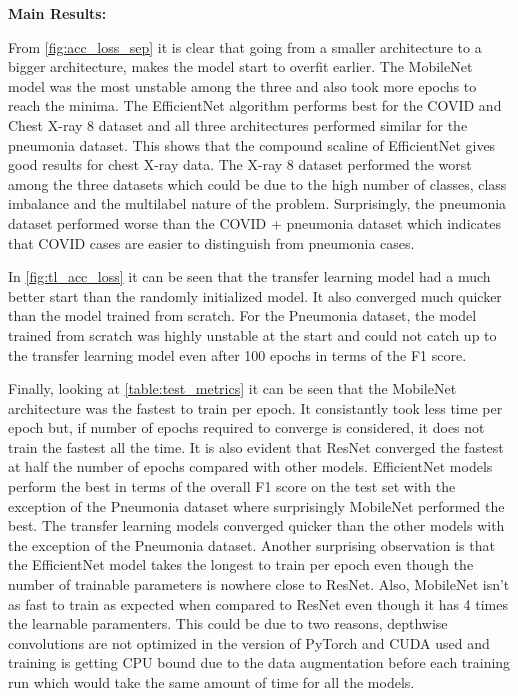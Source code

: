 \documentclass[10pt,twocolumn,letterpaper]{article}
\begin{document}
\textbf{Main Results:}

From \cref{fig:acc_loss_sep} it is clear that going from a smaller 
architecture to a bigger architecture, makes the model start to overfit earlier. 
The MobileNet model was the most unstable among the three and also took more epochs to reach 
the minima. The EfficientNet algorithm performs best for the COVID and Chest X-ray 8 
dataset and all three architectures performed similar for the pneumonia dataset. 
This shows that the compound scaline of EfficientNet gives good results for chest X-ray data.
The X-ray 8 dataset performed the worst among the three datasets which could be due to the 
high number of classes, class imbalance and the multilabel nature of the problem. 
Surprisingly, the pneumonia dataset performed worse than the COVID + pneumonia dataset 
which indicates that COVID cases are easier to distinguish from pneumonia cases. 

In \cref{fig:tl_acc_loss} it can be seen that the transfer learning model had a much better start than 
the randomly initialized model. It also converged much quicker than the model trained from scratch.
For the Pneumonia dataset, the model trained from scratch was highly unstable at the start 
and could not catch up to the transfer learning model even after 100 epochs in terms of the F1 score.

Finally, looking at \cref{table:test_metrics} it can be seen that the MobileNet architecture was 
the fastest to train per epoch. It consistantly took less time per epoch but, if number of 
epochs required to converge is considered, it does not train the fastest all the time.
It is also evident that ResNet converged the fastest at half the number of epochs compared with other models. 
EfficientNet models perform the best in terms of the overall F1 score on the test set with the exception of 
the Pneumonia dataset where surprisingly 
MobileNet performed the best. The transfer learning models converged quicker 
than the other models with the exception of the Pneumonia dataset. Another surprising observation 
is that the EfficientNet model takes the longest to train per epoch even though the number of trainable 
parameters is nowhere close to ResNet. Also, MobileNet isn't as fast to train as expected when 
compared to ResNet even though it has 4 times the learnable paramenters. This could be due to two 
reasons, depthwise convolutions are not optimized in the version of PyTorch and CUDA used and 
training is getting CPU bound due to the data augmentation before each training run which 
would take the same amount of time for all the models. 
\end{document}
